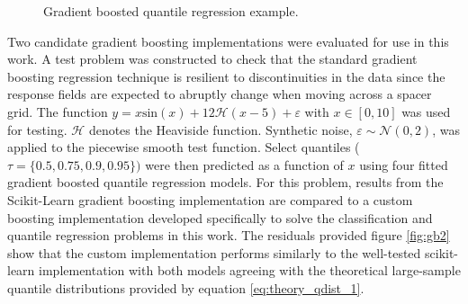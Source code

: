 

  


\begin{figure}[H]%
    \centering
    \qquad
    \qquad
    \qquad
    \qquad
    \caption[Gradient boosted quantile regression example.]{Gradient boosted quantile regression example.}%
    \label{fig:gb1}%
\end{figure}

Two candidate gradient boosting implementations were evaluated for use in this work.  A test problem was constructed to check that the standard gradient boosting regression technique is resilient to discontinuities in the data since the response fields are expected to abruptly change when moving across a spacer grid.  The function $y = x \mathrm{sin}(x) +12 \mathcal H(x-5)+\varepsilon$ with $x\in [0,10]$ was used for testing.  $\mathcal H$ denotes the Heaviside function. Synthetic noise, $\varepsilon \sim \mathcal N(0,2)$, was applied to the piecewise smooth test function.   Select quantiles ($\tau = \{0.5, 0.75, 0.9, 0.95 \})$ were then predicted as a function of $x$ using four fitted gradient boosted quantile regression models. For this problem, results from the Scikit-Learn gradient boosting implementation are compared to a custom boosting implementation developed specifically to solve the classification and quantile regression problems in this work.  The residuals provided figure \ref{fig:gb2} show that the custom implementation performs similarly to the well-tested scikit-learn implementation with both models agreeing with the theoretical large-sample quantile distributions provided by equation \ref{eq:theory_qdist_1}.

